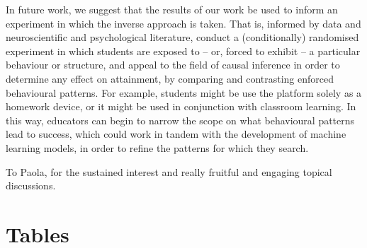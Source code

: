 \documentclass[sigplan,screen]{acmart}
\begin{document}
In future work, we suggest that the results of our work be used to inform an experiment in which the inverse approach is taken. That is, informed by data and neuroscientific and psychological literature, conduct a (conditionally) randomised experiment in which students are exposed to -- or, forced to exhibit -- a particular behaviour or structure, and appeal to the field of causal inference in order to determine any effect on attainment, by comparing and contrasting enforced behavioural patterns. For example, students might be use the platform solely as a homework device, or it might be used in conjunction with classroom learning. In this way, educators can begin to narrow the scope on what behavioural patterns lead to success, which could work in tandem with the development of machine learning models, in order to refine the patterns for which they search. 



\begin{acks}
To Paola, for the sustained interest and really fruitful and engaging topical discussions.
\end{acks}





\appendix

\section{Tables}
\end{document}
